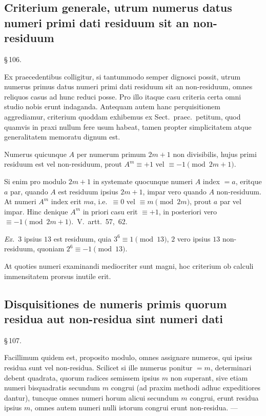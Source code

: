 \documentclass[12pt,a4paper]{article}
\theoremstyle{plain}
\theoremstyle{definition}
\theoremstyle{remark}
\begin{document}
\subsection*{Criterium generale, utrum numerus datus numeri primi dati residuum sit an non-residuum}

\begin{center}\S\,106.\end{center}

Ex praecedentibus colligitur, si tantummodo semper dignosci possit, utrum numerus primus datus numeri primi dati residuum sit an non-residuum, omnes reliquos casus ad hunc reduci posse. Pro illo itaque casu criteria certa omni studio nobis erunt indaganda. Antequam autem hanc perquisitionem aggrediamur, criterium quoddam exhibemus ex Sect.\ praec.\ petitum, quod quamvis in praxi nullum fere usum habeat, tamen propter simplicitatem atque generalitatem memoratu dignum est.

Numerus quicunque $A$ per numerum primum $2m+1$ non divisibilis, hujus primi residuum est vel non-residuum, prout $A^m \equiv +1$ vel $\equiv -1 \pmod{2m+1}$.

Si enim pro modulo $2m+1$ in systemate quocunque numeri $A$ index $= a$, eritque $a$ par, quando $A$ est residuum ipsius $2m+1$, impar vero quando $A$ non-residuum. At numeri $A^m$ index erit $ma$, i.e.\ $\equiv 0$ vel $\equiv m \pmod{2m}$, prout $a$ par vel impar. Hinc denique $A^m$ in priori casu erit $\equiv +1$, in posteriori vero $\equiv -1 \pmod{2m+1}$.\ V.\ artt.~57,~62.

\textit{Ex.}\ $3$ ipsius $13$ est residuum, quia $3^6 \equiv 1 \pmod{13}$, $2$ vero ipsius $13$ non-residuum, quoniam $2^6 \equiv -1 \pmod{13}$.

At quoties numeri examinandi mediocriter sunt magni, hoc criterium ob calculi immensitatem prorsus inutile erit.

\subsection*{Disquisitiones de numeris primis quorum residua aut non-residua sint numeri dati}

\begin{center}\S\,107.\end{center}

Facillimum quidem est, proposito modulo, omnes assignare numeros, qui ipsius residua sunt vel non-residua. Scilicet si ille numerus ponitur $= m$, determinari debent quadrata, quorum radices semissem ipsius $m$ non superant, sive etiam numeri bisquadratis secundum $m$ congrui (ad praxim methodi adhuc expeditiores dantur), tuncque omnes numeri horum alicui secundum $m$ congrui, erunt residua ipsius $m$, omnes autem numeri nulli istorum congrui erunt non-residua. ---
\end{document}
